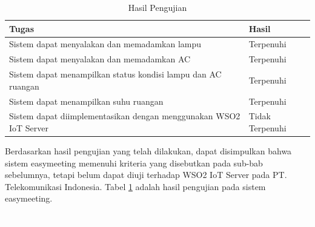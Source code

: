 \begin{table}[h!]
	\centering
	\begin{tabular}{|p{6cm}|p{4cm}|}
		\hline
		\textbf{Tugas} & \textbf{Hasil}\\ \hline
		Sistem dapat menyalakan dan memadamkan lampu & Terpenuhi\\ \hline
		Sistem dapat menyalakan dan memadamkan AC & Terpenuhi\\ \hline
		Sistem dapat menampilkan status kondisi lampu dan AC ruangan & Terpenuhi\\ \hline
		Sistem dapat menampilkan suhu ruangan & Terpenuhi\\ \hline
		Sistem dapat diimplementasikan dengan menggunakan WSO2 IoT Server & Tidak Terpenuhi\\ \hline
	\end{tabular}\caption{Hasil Pengujian}
	\label{tab:hasil_pengujian}
\end{table}

Berdasarkan hasil pengujian yang telah dilakukan, dapat disimpulkan bahwa sistem easymeeting memenuhi kriteria yang disebutkan pada sub-bab sebelumnya, tetapi belum dapat diuji terhadap WSO2 IoT Server pada PT. Telekomunikasi Indonesia. Tabel \ref{tab:hasil_pengujian} adalah hasil pengujian pada sistem easymeeting.

\vspace{4 cm}
\textcolor{white}{..}
